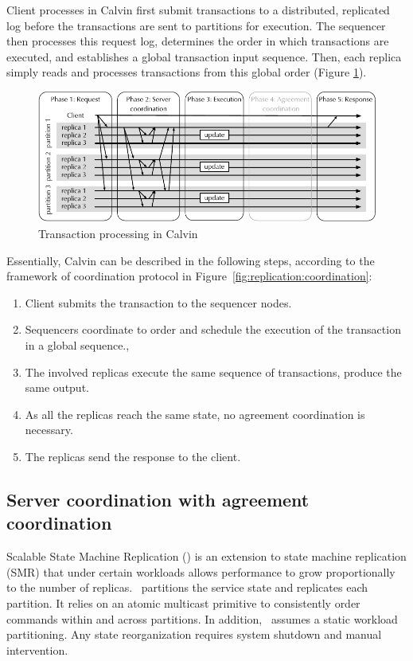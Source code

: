 Client processes in Calvin first submit transactions to a distributed,
replicated log before the transactions are sent to partitions for execution. The sequencer then
processes this request log, determines the order in which transactions are
executed, and establishes a global transaction input sequence. Then, each replica
simply reads and processes transactions from this global order (Figure
\ref{fig:calvin}).

\begin{figure}
  \begin{minipage}[b]{1.0\linewidth}
  \centering
        \includegraphics[width=1\linewidth]{figures/calvin}
  \end{minipage}
  \caption{Transaction processing in Calvin}
  \label{fig:calvin}
\end{figure}

Essentially, Calvin can be described in the following steps, according to
the framework of coordination protocol in
Figure~\ref{fig:replication:coordination}:

\begin{enumerate}
  \item Client submits the transaction to the sequencer nodes.
  \item Sequencers coordinate to order and schedule the execution of the transaction in a global sequence.,
  \item The involved replicas execute the same sequence of transactions, produce the same output.
  \item As all the replicas reach the same state, no agreement coordination is necessary.
  \item The replicas send the response to the client.
\end{enumerate}

\subsection{Server coordination with agreement coordination}
\label{sec:ssmr}
Scalable State Machine Replication (\ssmr) is an extension to state machine replication (SMR) that under
certain workloads allows performance to grow proportionally to the number of
replicas. \ssmr\ partitions the service state and replicates each partition. It
relies on an atomic multicast primitive to consistently order commands within
and across partitions. In addition, \ssmr\ assumes a static workload
partitioning. Any state reorganization requires system shutdown and manual
intervention.

